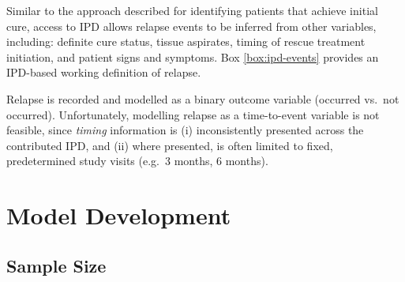 Similar to the approach described for identifying patients that achieve initial cure, access to IPD allows relapse events to be inferred from other variables, including: definite cure status, tissue aspirates, timing of rescue treatment initiation, and patient signs and symptoms. Box \ref{box:ipd-events} provides an IPD-based working definition of relapse.

Relapse is recorded and modelled as a binary outcome variable (occurred vs.\ not occurred). Unfortunately, modelling relapse as a time-to-event variable is not feasible, since \textit{timing} information is (i) inconsistently presented across the contributed IPD, and (ii) where presented, is often limited to fixed, predetermined study visits (e.g.\ 3 months, 6 months).

\section{Model Development}



\subsection{\label{sec:meth-samp}Sample Size}

